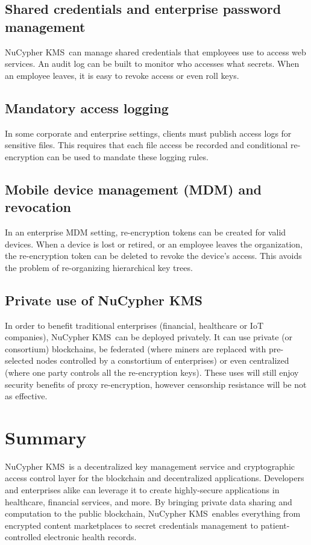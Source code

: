 \documentclass[longbibliography,nofootinbib]{revtex4-1}
\newcommand{\kms}{NuCypher KMS}
\begin{document}
\subsection{Shared credentials and enterprise password management}
\kms~can manage shared credentials that employees use to access web services.
An audit log can be built to monitor who accesses what secrets.
When an employee leaves, it is easy to revoke access or even roll keys.

\subsection{Mandatory access logging}
In some corporate and enterprise settings, clients must publish access logs for sensitive files.
This requires that each file access be recorded and conditional re-encryption can be used to mandate these logging rules.

\subsection{Mobile device management (MDM) and revocation}
\label{sec:mdm}
In an enterprise MDM setting, re-encryption tokens can be created for valid devices. When a device is lost or retired,
or an employee leaves the organization, the re-encryption token can be deleted to revoke the device's access. This avoids the
problem of re-organizing hierarchical key trees.

\subsection{Private use of \kms}
In order to benefit traditional enterprises (financial, healthcare or IoT companies), \kms~can be deployed privately.
It can use private (or consortium) blockchains,
be federated (where miners are replaced with pre-selected nodes controlled by a constortium of enterprises)
or even centralized (where one party controls all the re-encryption keys).
These uses will still enjoy security benefits of proxy re-encryption, however censorship resistance will be not as effective.

\section{Summary}
\kms~is a decentralized key management service and cryptographic access control layer for the blockchain and
decentralized applications.
Developers and enterprises alike can leverage it to create highly-secure applications in healthcare,
financial services, and more.
By bringing private data sharing and computation to the public blockchain, \kms~enables everything from encrypted
content marketplaces to secret credentials management to patient-controlled electronic health records.
\end{document}

